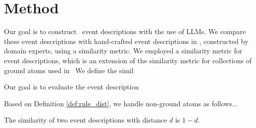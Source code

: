 \section{Method}\label{sec:method}

Our goal is to construct \rtec\ event descriptions with the use of LLMs.
%
We compare these event descriptions with hand-crafted event descriptions in \rtec, constructed by domain experts, using a similarity metric.
%
We employed a similarity metric for event descriptions, which is an extension of the similarity metric for collections of ground atoms used in~\cite{DBLP:journals/ml/MichelioudakisA19}
%
We define the simil

Our goal is to evaluate the event description

\begin{definition}\label{def:ground_atom_dist}

%
\qeddef
%
\end{definition}

\begin{definition}\label{def:rule_dist}

%
\qeddef
%
\end{definition}

Based on Definition \ref{def:rule_dist}, we handle non-ground atoms as follows... 

\begin{definition}\label{def:ed_dist}

%
\qeddef
%
\end{definition}

The similarity of two event descriptions with distance $d$ is $1\minus d$.
